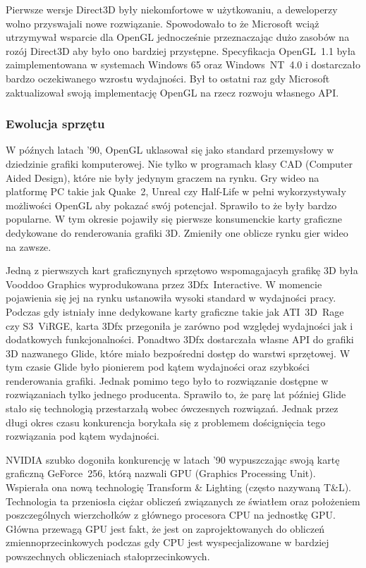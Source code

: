 Pierwsze wersje Direct3D były niekomfortowe w użytkowaniu, a deweloperzy wolno przyswajali nowe rozwiązanie. Spowodowało to że Microsoft wciąż utrzymywał wsparcie dla OpenGL jednocześnie przeznaczając dużo zasobów na rozój Direct3D aby było ono bardziej przystępne. Specyfikacja OpenGL~1.1 była zaimplementowana w systemach Windows 65 oraz Windows~NT~4.0 i dostarczało bardzo oczekiwanego wzrostu wydajności. Był to ostatni raz gdy Microsoft zaktualizował swoją implementację OpenGL na rzecz rozwoju własnego API.

\subsubsection{Ewolucja sprzętu}
\thispagestyle{empty}
\par\indent

W późnych latach '90, OpenGL uklasował się jako standard przemysłowy w dziedzinie grafiki komputerowej. Nie tylko w programach klasy CAD (Computer Aided Design), które nie były jedynym graczem na rynku. Gry wideo na platformę PC takie jak Quake~2, Unreal czy Half-Life w pełni wykorzystywały możliwości OpenGL aby pokazać swój potencjał. Sprawiło to że były bardzo popularne. W tym okresie pojawiły się pierwsze konsumenckie karty graficzne dedykowane do renderowania grafiki 3D. Zmieniły one oblicze rynku gier wideo na zawsze.

Jedną z pierwszych kart graficznynych sprzętowo wspomagajacyh grafikę 3D była Vooddoo Graphics wyprodukowana przez 3Dfx~Interactive. W momencie pojawienia się jej na rynku ustanowiła wysoki standard w wydajności pracy. Podczas gdy istniały inne dedykowane karty graficzne takie jak ATI~3D~Rage czy S3~ViRGE, karta 3Dfx przegoniła je zarówno pod względej wydajności jak i dodatkowych funkcjonalności. Ponadtwo 3Dfx dostarczała własne API do grafiki 3D nazwanego Glide, które miało bezpośredni dostęp do warstwi sprzętowej. W tym czasie Glide było pionierem pod kątem wydajności oraz szybkości renderowania grafiki. Jednak pomimo tego było to rozwiązanie dostępne w rozwiązaniach tylko jednego producenta. Sprawiło to, że parę lat później Glide stało się technologią przestarzałą wobec ówczesnych rozwiązań. Jednak przez długi okres czasu konkurencja borykała się z problemem doścignięcia tego rozwiązania pod kątem wydajności.

NVIDIA szubko dogoniła konkurencję w latach '90 wypuszczając swoją kartę graficzną GeForce~256, którą nazwali GPU (Graphics Processing Unit). Wspierała ona nową technologię Transform \& Lighting (często nazywaną T\&L). Technologia ta przeniosła ciężar obliczeń związanych ze światłem oraz położeniem poszczególnych wierzchołków z głównego procesora CPU na jednostkę GPU. Główna przewagą GPU jest fakt, że jest on zaprojektowanych do obliczeń zmiennoprzecinkowych podczas gdy CPU jest wyspecjalizowane w bardziej powszechnych obliczeniach stałoprzecinkowych. 

